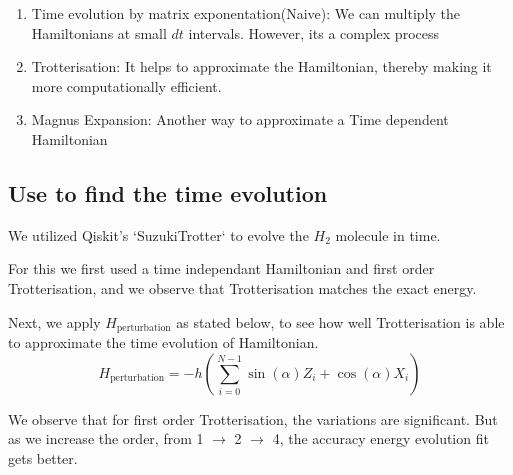 \documentclass[%
reprint,
 amsmath,amssymb,
 aps,
]{revtex4-2}
\begin{document}
\begin{enumerate}
    \item Time evolution by matrix exponentation(Naive): We can multiply the Hamiltonians at small $dt$ intervals. However, its a complex process
    \item Trotterisation: It helps to approximate the Hamiltonian, thereby making it more computationally efficient.
    \item Magnus Expansion: Another way to approximate a Time dependent Hamiltonian
\end{enumerate}

\subsection{\label{sec:level2} Use  to find the time evolution}
We utilized Qiskit's `SuzukiTrotter` to evolve the $H_2$ molecule in time.

For this we first used a time independant Hamiltonian and first order Trotterisation, and we observe that Trotterisation matches the exact energy. \newline

Next, we apply $H_{\text{perturbation}}$ as stated below, to see how well Trotterisation is able to approximate the time evolution of Hamiltonian. \\
$$
H_{\text{perturbation}} = -h \left( \sum_{i=0}^{N-1} \sin(\alpha) Z_i + \cos(\alpha) X_i \right)
$$

We observe that for first order Trotterisation, the variations are significant. But as we increase the order, from 1 $\rightarrow$ 2 $\rightarrow$ 4, 
the accuracy energy evolution fit gets better.
\end{document}

